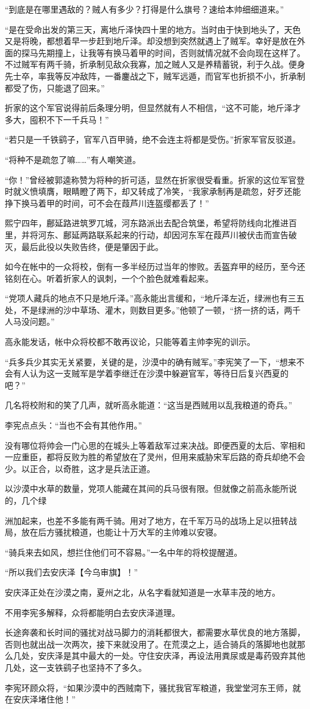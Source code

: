 “到底是在哪里遇敌的？贼人有多少？打得是什么旗号？速给本帅细细道来。”

“是在受命出发的第三天，离地斤泽快四十里的地方。当时由于快到地头了，天色又是将晚，都想着早一步赶到地斤泽。却没想到突然就遇上了贼军。幸好是放在外面的探马先期撞上，让我等有换马着甲的时间，否则就情况就不会向现在这样了。不过贼军有两千骑，折承制见敌众我寡，加之贼人又是养精蓄锐，利于久战。便身先士卒，率我等反冲敌阵，一番鏖战之下，贼军远遁，而官军也折损不小，折承制都受了伤，只能退了回来。”

折家的这个军官说得前后条理分明，但显然就有人不相信，“这不可能，地斤泽才多大，囤积不下一千兵马！”

“若只是一千铁鹞子，官军八百甲骑，绝不会连主将都是受伤。”折家军官反驳道。

“将种不是疏忽了嘛……”有人嘲笑道。

“你！”曾经被郭逵称赞为将种的折可适，显然在折家很受看重。折家的这位军官登时就义愤填膺，眼睛瞪了两下，却又转成了冷笑，“我家承制再是疏忽，好歹还能挣下换马着甲的时间，可不会在葭芦川连盔缨都丢了！”

熙宁四年，鄜延路进筑罗兀城，河东路派出去配合筑堡，希望将防线向北推进百里，并将河东、鄜延两路联系起来的行动，却因河东军在葭芦川被伏击而宣告破灭，最后此役以失败告终，便是肇因于此。

如今在帐中的一众将校，倒有一多半经历过当年的惨败。丢盔弃甲的经历，至今还铭刻在心。听着折家人的讽刺，一个个脸色就难看起来。

“党项人藏兵的地点不只是地斤泽。”高永能出言缓和，“地斤泽左近，绿洲也有三五处，不是绿洲的沙中草场、灌木，则数目更多。”他顿了一顿，“挤一挤的话，两千人马没问题。”

高永能发话，帐中众将校都不敢再议论，只能等着主帅李宪的训示。

“兵多兵少其实无关紧要，关键的是，沙漠中的确有贼军。”李宪笑了一下，“想来不会有人认为这一支贼军是学着李继迁在沙漠中躲避官军，等待日后复兴西夏的吧？”

几名将校附和的笑了几声，就听高永能道：“这当是西贼用以乱我粮道的奇兵。”

李宪点点头：“当也不会有其他作用。”

没有哪位将帅会一门心思的在城头上等着敌军过来决战。即便西夏的太后、宰相和一应重臣，都将反败为胜的希望放在了灵州，但用来威胁宋军后路的奇兵却绝不会少。以正合，以奇胜，这才是兵法正道。

以沙漠中水草的数量，党项人能藏在其间的兵马很有限。但就像之前高永能所说的，几个绿

洲加起来，也差不多能有两千骑。用对了地方，在千军万马的战场上足以扭转战局，放在后方骚扰粮道，也能让十万大军的主帅难以安寝。

“骑兵来去如风，想拦住他们可不容易。”一名中年的将校提醒道。

“所以我们去安庆泽【今乌审旗】！”

安庆泽正处在沙漠之南，夏州之北，从名字看就知道是一水草丰茂的地方。

不用李宪多解释，众将都能明白去安庆泽道理。

长途奔袭和长时间的骚扰对战马脚力的消耗都很大，都需要水草优良的地方落脚，否则也就出战一次两次，接下来就没用了。在荒漠之上，适合骑兵的落脚地也就那么几处，安庆泽是其中最大的一处。守住安庆泽，再设法用粪尿或是毒药毁弃其他几处，这一支铁鹞子也坚持不了多久。

李宪环顾众将，“如果沙漠中的西贼南下，骚扰我官军粮道，我堂堂河东王师，就在安庆泽堵住他！”

